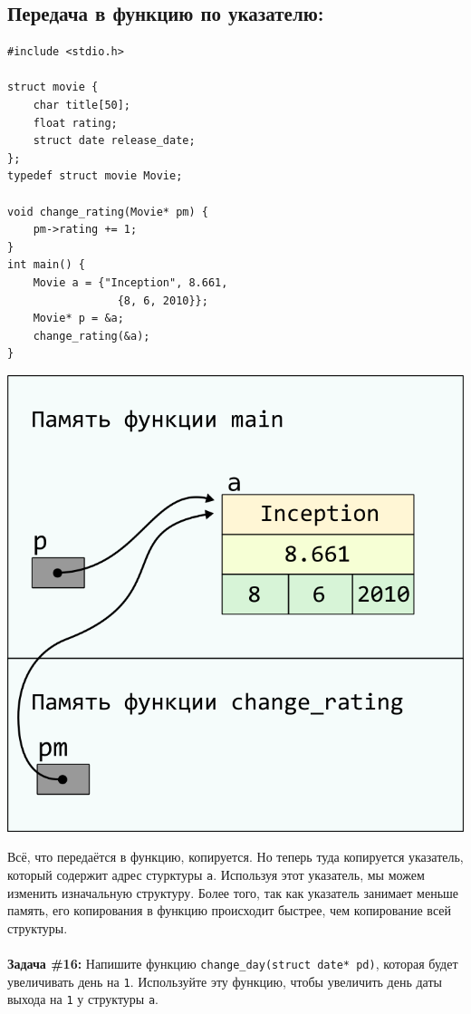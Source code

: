 \documentclass{article}
\begin{document}
\subsection*{Передача в функцию по указателю:}
\begin{multicols}{2}
\begin{lstlisting}
#include <stdio.h>

struct movie {
	char title[50];
	float rating;
	struct date release_date;
};
typedef struct movie Movie;

void change_rating(Movie* pm) {
	pm->rating += 1;
}
int main() {
	Movie a = {"Inception", 8.661, 
	             {8, 6, 2010}};
	Movie* p = &a;
	change_rating(&a);
}
\end{lstlisting}
\columnbreak
\begin{center}
\includegraphics[scale=1]{../images/pointer_schemes/function_by_pointer.png}
\end{center}
\end{multicols}
Всё, что передаётся в функцию, копируется. Но теперь туда копируется указатель, который содержит
адрес стурктуры \texttt{a}. Используя этот указатель, мы можем изменить изначальную структуру. Более того, так как указатель занимает меньше память, его копирования в функцию происходит быстрее, чем копирование всей структуры.\\\\
\textbf{Задача \#16:} Напишите функцию \texttt{change\_day(struct date* pd)}, которая будет увеличивать день на \texttt{1}. Используйте эту функцию, чтобы увеличить день даты выхода на \texttt{1} у структуры \texttt{a}.\\
\newpage
\end{document}
